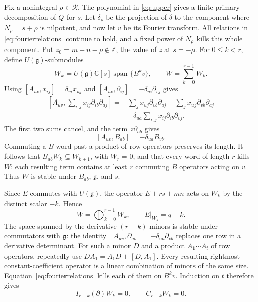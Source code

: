 \documentclass[11pt,a4paper]{article}
\numberwithin{equation}{section}
\theoremstyle{definition}
\newcommand{\C}{\mathbb C}
\newcommand{\Z}{\mathbb Z}
\newcommand{\g}{\mathfrak g}
\DeclareMathOperator{\Span}{span}
\begin{document}
Fix a nonintegral $\rho\in\mathcal R$. The polynomial in
\eqref{eq:upper} gives a finite primary decomposition of $Q$ for
$s$. Let $\delta_\rho$ be the projection of $\delta$ to the component
where $N_\rho=s+\rho$ is nilpotent, and now let $v$ be its Fourier
transform. All relations in \eqref{eq:fourierrelations} continue to
hold, and a fixed power of $N_\rho$ kills this whole component.
Put $z_0=m+n-\rho\notin\Z$, the value of $z$ at $s=-\rho$.
For $0\le k<r$, define $U(\g)$-submodules
\begin{equation}\label{eq:W}
W_k=U(\g)\C[s]\Span\{B^kv\},\qquad
W=\sum_{k=0}^{r-1}W_k.
\end{equation}
Using
$[A_{uv},x_{ij}]=\delta_{vi}x_{uj}$ and
$[A_{uv},\partial_{ij}]=-\delta_{ui}\partial_{vj}$ gives
\begin{align*}
\left[A_{uv},\sum_{i,j}x_{ij}\partial_{ib}\partial_{aj}\right]
={}&\sum_jx_{uj}\partial_{vb}\partial_{aj}
 -\sum_jx_{uj}\partial_{vb}\partial_{aj}\\
&-\delta_{ua}\sum_{i,j}x_{ij}\partial_{ib}\partial_{vj}.
\end{align*}
The first two sums cancel, and the term $z\partial_{ab}$ gives
\begin{equation}\label{eq:AB}
[A_{uv},B_{ab}]=-\delta_{ua}B_{vb}.
\end{equation}
Commuting a $B$-word past a product of row operators preserves its
length. It follows that $B_{ab}W_k\subseteq W_{k+1}$, with $W_r=0$,
and that every word of length $r$ kills $W$: each resulting term
contains at least $r$ commuting $B$ operators acting on $v$.
Thus $W$ is stable under $B_{ab}$, $\g$, and $s$.

Since $E$ commutes with $U(\g)$, the operator $E+rs+mn$ acts on
$W_k$ by the distinct scalar $-k$. Hence
\begin{equation}\label{eq:Wdirect}
W=\bigoplus_{k=0}^{r-1}W_k,\qquad E|_{W_k}=q-k.
\end{equation}
The space spanned by the derivative $(r-k)$-minors is stable under
commutators with $\g$: the identity
$[A_{uv},\partial_{ab}]=-\delta_{ua}\partial_{vb}$ replaces one
row in a derivative determinant. For such a minor $D$ and a product
$A_1\cdots A_t$ of row operators, repeatedly use
$DA_1=A_1D+[D,A_1]$. Every resulting rightmost constant-coefficient
operator is a linear combination of minors of the same size.
Equation~\eqref{eq:fourierrelations} kills each of them on $B^kv$.
Induction on $t$ therefore gives
\begin{equation}\label{eq:Cvanishing}
I_{r-k}(\partial)W_k=0,\qquad C_{r-k}W_k=0.
\end{equation}
\end{document}

